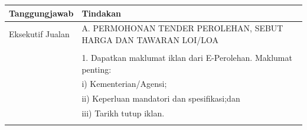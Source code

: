 \documentclass[
]{article}
\begin{document}
\begin{longtable}[]{@{}ll@{}}
\toprule
\begin{minipage}[b]{0.27\columnwidth}\raggedright
Tanggungjawab\strut
\end{minipage} & \begin{minipage}[b]{0.67\columnwidth}\raggedright
Tindakan\strut
\end{minipage}\tabularnewline
\midrule
\endhead
\begin{minipage}[t]{0.27\columnwidth}\raggedright
Eksekutif Jualan\strut
\end{minipage} & \begin{minipage}[t]{0.67\columnwidth}\raggedright
A. PERMOHONAN TENDER PEROLEHAN, SEBUT HARGA DAN TAWARAN LOI/LOA\strut
\end{minipage}\tabularnewline
\begin{minipage}[t]{0.27\columnwidth}\raggedright
\strut
\end{minipage} & \begin{minipage}[t]{0.67\columnwidth}\raggedright
\strut
\end{minipage}\tabularnewline
\begin{minipage}[t]{0.27\columnwidth}\raggedright
\strut
\end{minipage} & \begin{minipage}[t]{0.67\columnwidth}\raggedright
1. Dapatkan maklumat iklan dari E-Perolehan. Maklumat penting:\strut
\end{minipage}\tabularnewline
\begin{minipage}[t]{0.27\columnwidth}\raggedright
\strut
\end{minipage} & \begin{minipage}[t]{0.67\columnwidth}\raggedright
i) Kementerian/Agensi;\strut
\end{minipage}\tabularnewline
\begin{minipage}[t]{0.27\columnwidth}\raggedright
\strut
\end{minipage} & \begin{minipage}[t]{0.67\columnwidth}\raggedright
ii) Keperluan mandatori dan spesifikasi;dan\strut
\end{minipage}\tabularnewline
\begin{minipage}[t]{0.27\columnwidth}\raggedright
\strut
\end{minipage} & \begin{minipage}[t]{0.67\columnwidth}\raggedright
iii) Tarikh tutup iklan.\strut
\end{minipage}\tabularnewline
\begin{minipage}[t]{0.27\columnwidth}\raggedright

\end{minipage}
\end{longtable}
\end{document}
